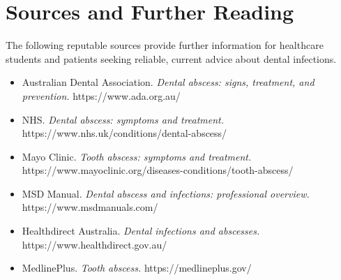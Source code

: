 \section*{Sources and Further Reading}
The following reputable sources provide further information for healthcare students and patients seeking reliable, current advice about dental infections.

\begin{itemize}
    \item Australian Dental Association. \textit{Dental abscess: signs, treatment, and prevention.} https://www.ada.org.au/
    \item NHS. \textit{Dental abscess: symptoms and treatment.} https://www.nhs.uk/conditions/dental-abscess/
    \item Mayo Clinic. \textit{Tooth abscess: symptoms and treatment.} https://www.mayoclinic.org/diseases-conditions/tooth-abscess/
    \item MSD Manual. \textit{Dental abscess and infections: professional overview.} https://www.msdmanuals.com/
    \item Healthdirect Australia. \textit{Dental infections and abscesses.} https://www.healthdirect.gov.au/
    \item MedlinePlus. \textit{Tooth abscess.} https://medlineplus.gov/
\end{itemize}
